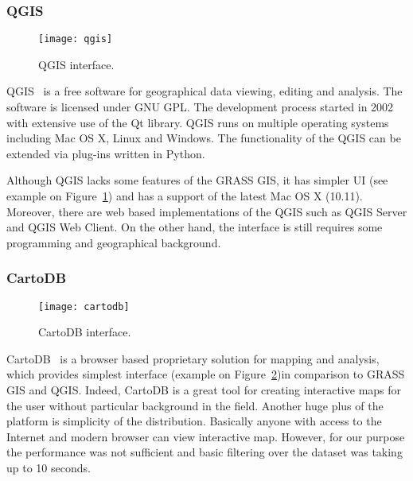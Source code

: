 \subsubsection{QGIS}

\begin{figure}[ht]
  {\par\centering
  \texttt{[image: qgis]}
  \par}
  \caption{QGIS interface.}
  \label{pic:qgis}
\end{figure}

QGIS~\cite{qgis} is a free software for geographical data viewing, editing and analysis. The
software is licensed under GNU GPL. The development process started in 2002 with extensive use of
the Qt library. QGIS runs on multiple operating systems including Mac OS X, Linux and Windows. The
functionality of the QGIS can be extended via plug-ins written in Python.

Although QGIS lacks some features of the GRASS GIS, it has simpler UI (see example on
Figure~\ref{pic:qgis}) and has a support of the latest Mac OS X (10.11). Moreover, there are web
based implementations of the QGIS such as QGIS Server and QGIS Web Client. On the other hand, the
interface is still requires some programming and geographical background.

\subsubsection{CartoDB}

\begin{figure}[ht]
  {\par\centering
  \texttt{[image: cartodb]}
  \par}
  \caption{CartoDB interface.}
  \label{pic:cartodb}
\end{figure}

CartoDB~\cite{cartodb} is a browser based proprietary solution for mapping and analysis, which
provides simplest interface (example on Figure~\ref{pic:cartodb})in comparison to GRASS GIS and
QGIS. Indeed, CartoDB is a great tool for creating interactive maps for the user without particular
background in the field. Another huge plus of the platform is simplicity of the distribution.
Basically anyone with access to the Internet and modern browser can view interactive map. However,
for our purpose the performance was not sufficient and basic filtering over the dataset was taking
up to 10 seconds.

